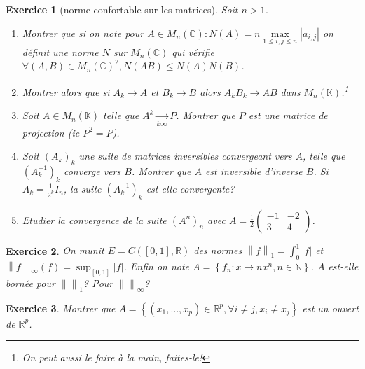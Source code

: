 \documentclass[12pt,a4paper]{article}
\newcommand{\norme}[1]{\left\lVert#1\right\rVert}
\newcommand{\R}{\mathbb{R}}
\newcommand{\C}{\mathbb{C}}
\newcommand{\N}{\mathbb{N}}
\newcommand{\K}{\mathbb{K} }
\theoremstyle{break}
\theoremstyle{break}
\newtheorem{Exo}{Exercice}
\begin{document}
\begin{Exo}[norme confortable sur les matrices]
	Soit $n>1$.
	\begin{enumerate}
		\item
		Montrer que si on note pour $A\in M_n(\C):N(A)=n\underset{1\leqslant i,j \leqslant n}{\max}|a_{i,j}|$ on définit une norme $N$ sur $M_n(\C)$ qui vérifie $\forall(A,B)\in M_n(\C)^2,N(AB)\leqslant N(A)N(B)$.
%		
		\item Montrer alors que si $A_k\to A$ et $B_k\to B$ alors $A_k B_k\to AB$ dans $M_n(\K)$.\footnote{On peut aussi le faire à la main, faites-le!}
		\item Soit $A\in M_n(\K)$ telle que $A^k\underset{k\infty}{\to}P$. Montrer que $P$ est une matrice de projection (ie $P^2=P$).
		\item Soit $(A_k)_k$ une suite de matrices inversibles convergeant vers $A$, telle que $(A_k^{-1})_k$ converge vers $B$. Montrer que $A$ est inversible d'inverse $B$. Si $A_k=\frac{1}{2^k}I_n$, la suite  $(A_k^{-1})_k$  est-elle convergente? 
		\item Etudier la convergence de la suite $(A^n)_n$ avec $A=\frac{1}{2}\begin{pmatrix}
			-1 & -2 \\
			3 & 4
		\end{pmatrix}$.
	
	\end{enumerate}
\end{Exo}

\begin{Exo}
On munit $E=C([0,1],\R)$ des normes $\norme{f}_1=\int_0^1|f|$ et 	$\norme{f}_{\infty}(f)=\sup_{[0,1]}|f|$. Enfin on note $A=\left\{f_n:x\mapsto nx^n,n\in\N\right\}$. $A$ est-elle bornée pour $\norme{ }_1$? Pour $\norme{ }_{\infty}$?
\end{Exo}

\begin{Exo}
	Montrer que $A=\left\{(x_1,\dots,x_p)\in\R^p,\forall i\neq j,x_i \neq x_j\right\}$ est un ouvert de $\R^p$.
\end{Exo}
	

%
%	
\end{document}
